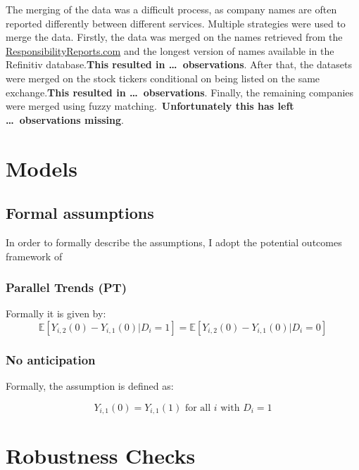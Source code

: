 \documentclass[12pt]{article}
\begin{document}
The merging of the data was a difficult process, as company names are often reported differently between different services. Multiple strategies were used to merge the data. Firstly, the data was merged on the names retrieved from the \href{https://responsibilityreports.com}{ResponsibilityReports.com} and the longest version of names available in the Refinitiv database.\@ \textbf{This resulted in \dots\ observations}. After that, the datasets were merged on the stock tickers conditional on being listed on the same exchange.\@ \textbf{This resulted in \dots\ observations}. Finally, the remaining companies were merged using fuzzy matching.\ \textbf{Unfortunately this has left \dots\ observations missing}.

\section{Models}\label{app:models}

\subsection{Formal assumptions}\label{app:models:assumptions}
In order to formally describe the assumptions, I adopt the potential outcomes framework of~\cite{rubinEstimatingCausalEffects1974}

\subsubsection{Parallel Trends (PT)}

Formally it is given by: 
\begin{equation}
    \mathbb{E}[Y_{i,2}(0) - Y_{i,1}(0) | D_i = 1] = \mathbb{E}[Y_{i,2}(0) - Y_{i,1}(0) | D_i = 0]
\end{equation}

\subsubsection{No anticipation}
Formally, the assumption is defined as:

\begin{equation}
    Y_{i,1}(0) = Y_{i,1}(1) \text{ for all } i \text{ with } D_i = 1
\end{equation}



\section{Robustness Checks}\label{app:robustness}
\end{document}
